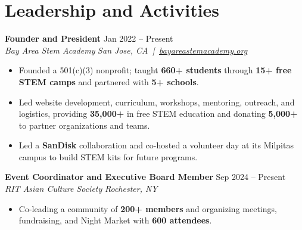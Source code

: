 \documentclass[10pt,letterpaper]{article}
\newif\ifresumeFirstRole
\newcommand{\resumeRole}[4]{%
  \ifresumeFirstRole
    \global\resumeFirstRolefalse
  \else
    \vspace{0pt plus 1fill}%
  \fi
  \textbf{#1} \hfill #2\\
  \textit{#3} \hfill \textit{#4}
}
\begin{document}
\section*{Leadership and Activities}

\resumeRole{Founder and President}{Jan 2022 -- Present}{Bay Area Stem Academy}{San Jose, CA \,|\, \href{https://bayareastemacademy.org}{bayareastemacademy.org}}
\begin{itemize}
  \item Founded a 501(c)(3) nonprofit; taught \textbf{660+ students} through \textbf{15+ free STEM camps} and partnered with \textbf{5+ schools}.
  \item Led website development, curriculum, workshops, mentoring, outreach, and logistics, providing \textbf{\textdollar{}35,000+} in free STEM education and donating \textbf{\textdollar{}5,000+} to partner organizations and teams.
  \item Led a \textbf{SanDisk} collaboration and co-hosted a volunteer day at its Milpitas campus to build STEM kits for future programs.
\end{itemize}

\resumeRole{Event Coordinator and Executive Board Member}{Sep 2024 -- Present}{RIT Asian Culture Society}{Rochester, NY}
\begin{itemize}
  \item Co-leading a community of \textbf{200+ members} and organizing meetings, fundraising, and Night Market with \textbf{600 attendees}.
\end{itemize}
\end{document}
